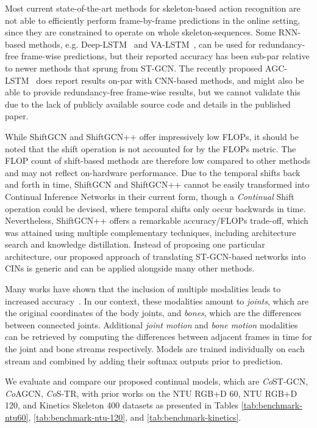 \documentclass[journal]{IEEEtran}
\theoremstyle{definition}
\begin{document}
Most current state-of-the-art methods for skeleton-based action recognition are not able to efficiently perform frame-by-frame predictions in the online setting, since they are constrained to operate on whole skeleton-sequences.
Some RNN-based methods, e.g. Deep-LSTM~\cite{Shahroudy_2016_NTURGBD} and VA-LSTM~\cite{zhang2017view}, can be used for redundancy-free frame-wise predictions, but their reported accuracy has been sub-par relative to newer methods that sprung from ST-GCN.
The recently proposed AGC-LSTM~\cite{si2019attention} does report results on-par with CNN-based methods, and might also be able to provide redundancy-free frame-wise results, but we cannot validate this due to the lack of publicly available source code and details in the published paper.

{While ShiftGCN and ShiftGCN++ offer impressively low FLOPs, it should be noted that the shift operation is not accounted for by the FLOPs metric. The FLOP count of shift-based methods are therefore low compared to other methods and may not reflect on-hardware performance. Due to the temporal shifts back and forth in time,  ShiftGCN and ShiftGCN++ cannot be easily transformed into Continual Inference Networks in their current form, though a \textit{Continual} Shift operation could be devised, where temporal shifts only occur backwards in time. Nevertheless, ShiftGCN++ offers a remarkable accuracy/FLOPs trade-off, which was attained using multiple complementary techniques, including architecture search and knowledge distillation. Instead of proposing one particular architecture, our proposed approach of translating ST-GCN-based networks into CINs is generic and can be applied alongside many other methods.}


Many works have shown that the inclusion of multiple modalities leads to increased accuracy~\cite{yan2018spatial, shi2019two, shi2019skeleton_directed, cheng2020skeleton, liu2020disentangling}. 
In our context, these modalities amount to \textit{joints}, which are the original coordinates of the body joints, and \textit{bones}, which are the differences between connected joints. Additional \textit{joint motion} and \textit{bone motion} modalities can be retrieved by computing the differences between adjacent frames in time for the joint and bone streams respectively.
Models are trained individually on each stream and combined by adding their softmax outputs prior to prediction.

We evaluate and compare our proposed continual models, which are \textit{Co}ST-GCN, \textit{Co}AGCN, \textit{Co}S-TR, with prior works on the NTU RGB+D 60, NTU RGB+D 120, and Kinetics Skeleton 400 datasets as presented in Tables \ref{tab:benchmark-ntu60}, \ref{tab:benchmark-ntu-120}, and \ref{tab:benchmark-kinetics}.
\end{document}
